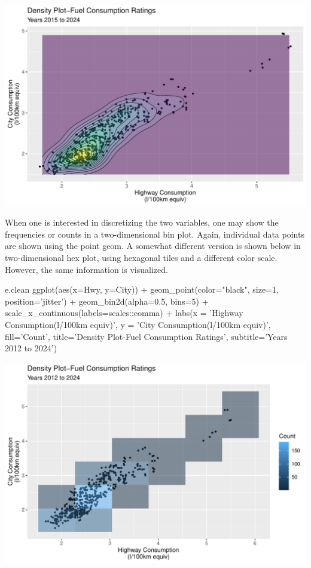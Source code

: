 \begin{center}
  \includegraphics[width=.8\textwidth]{fuel.density2d.pdf}
\end{center}

When one is interested in discretizing the two variables, one may show the frequencies or counts in a two-dimensional bin plot. Again, individual data points are shown using the point geom. A somewhat different version is shown below in two-dimensional hex plot, using hexagonal tiles and a different color scale. However, the same information is visualized.

\begin{samepage}
\begin{Rcode}
e.clean %
  ggplot(aes(x=Hwy, y=City)) + 
    geom_point(color="black", size=1, 
               position='jitter') +
    geom_bin2d(alpha=0.5, bins=5) + 
    scale_x_continuous(labels=scales::comma) +
    labs(x = 'Highway Consumption\n(l/100km equiv)', 
         y = 'City Consumption\n(l/100km equiv)', 
         fill='Count', 
         title='Density Plot-Fuel Consumption Ratings', 
         subtitle='Years 2012 to 2024') 
\end{Rcode}
\end{samepage}

\begin{center}
  \includegraphics[width=.8\textwidth]{fuel.bin2d.pdf}
\end{center}

